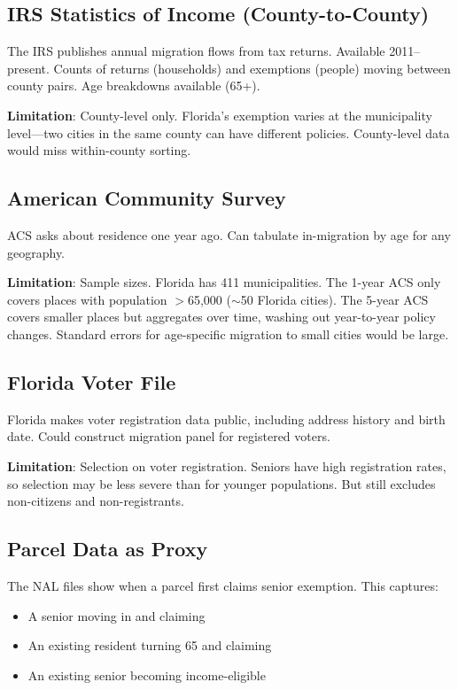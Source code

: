 \documentclass[11pt]{article}
\begin{document}
\subsection{IRS Statistics of Income (County-to-County)}

The IRS publishes annual migration flows from tax returns. Available 2011--present. Counts of returns (households) and exemptions (people) moving between county pairs. Age breakdowns available (65+).

\textbf{Limitation}: County-level only. Florida's exemption varies at the municipality level---two cities in the same county can have different policies. County-level data would miss within-county sorting.

\subsection{American Community Survey}

ACS asks about residence one year ago. Can tabulate in-migration by age for any geography.

\textbf{Limitation}: Sample sizes. Florida has 411 municipalities. The 1-year ACS only covers places with population $>$65,000 ($\sim$50 Florida cities). The 5-year ACS covers smaller places but aggregates over time, washing out year-to-year policy changes. Standard errors for age-specific migration to small cities would be large.

\subsection{Florida Voter File}

Florida makes voter registration data public, including address history and birth date. Could construct migration panel for registered voters.

\textbf{Limitation}: Selection on voter registration. Seniors have high registration rates, so selection may be less severe than for younger populations. But still excludes non-citizens and non-registrants.

\subsection{Parcel Data as Proxy}

The NAL files show when a parcel first claims senior exemption. This captures:
\begin{itemize}
    \item A senior moving in and claiming
    \item An existing resident turning 65 and claiming
    \item An existing senior becoming income-eligible
\end{itemize}
\end{document}
